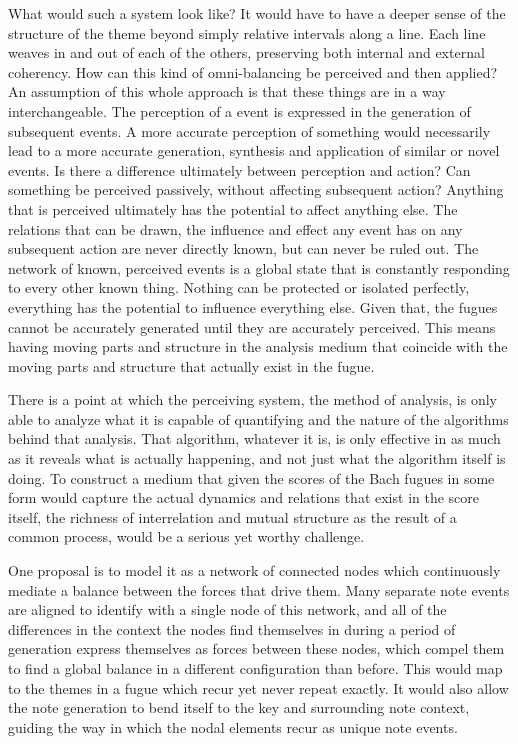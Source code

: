 \documentclass[11pt]{article}
\begin{document}
What would such a system look like?  It would have to have a deeper sense of the structure of the theme beyond simply relative intervals along a line.  Each line weaves in and out of each of the others, preserving both internal and external coherency.  How can this kind of omni-balancing be perceived and then applied?  An assumption of this whole approach is that these things are in a way interchangeable.  The perception of a event is expressed in the generation of subsequent events.  A more accurate perception of something would necessarily lead to a more accurate generation, synthesis and application of similar or novel events.  Is there a difference ultimately between perception and action?  Can something be perceived passively, without affecting subsequent action?  Anything that is perceived ultimately has the potential to affect anything else.  The relations that can be drawn, the influence and effect any event has on any subsequent action are never directly known, but can never be ruled out.  The network of known, perceived events is a global state that is constantly responding to every other known thing.  Nothing can be protected or isolated perfectly, everything has the potential to influence everything else.  Given that, the fugues cannot be accurately generated until they are accurately perceived.  This means having moving parts and structure in the analysis medium that coincide with the moving parts and structure that actually exist in the fugue.  

There is a point at which the perceiving system, the method of analysis, is only able to analyze what it is capable of quantifying and the nature of the algorithms behind that analysis.  That algorithm, whatever it is, is only effective in as much as it reveals what is actually happening, and not just what the algorithm itself is doing.  To construct a medium that given the scores of the Bach fugues in some form would capture the actual dynamics and relations that exist in the score itself, the richness of interrelation and mutual structure as the result of a common process, would be a serious yet worthy challenge.

One proposal is to model it as a network of connected nodes which continuously mediate a balance between the forces that drive them.  Many separate note events are aligned to identify with a single node of this network, and all of the differences in the context the nodes find themselves in during a period of generation express themselves as forces between these nodes, which compel them to find a global balance in a different configuration than before.  This would map to the themes in a fugue which recur yet never repeat exactly.  It would also allow the note generation to bend itself to the key and surrounding note context, guiding the way in which the nodal elements recur as unique note events.  
\end{document}
